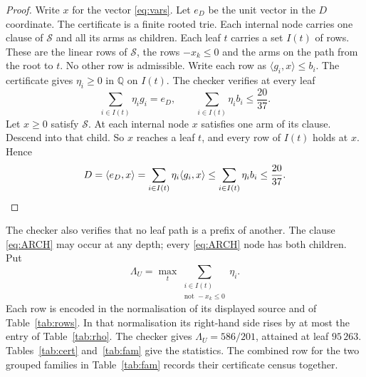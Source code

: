 \documentclass{amsart}
\theoremstyle{definition}
\theoremstyle{plain}
\numberwithin{equation}{section}
\numberwithin{table}{section}
\newcommand{\certLambda}{586/201}
\newcommand{\certLambdaLeaf}{95\,263}
\begin{document}
\begin{proof}
Write $x$ for the vector \eqref{eq:vars}. Let $e_D$ be the unit vector in the
$D$ coordinate. The certificate is a finite rooted trie. Each internal node
carries one clause of $\mathcal S$ and all its arms as children. Each leaf
$t$ carries a set $I(t)$ of rows. These are the linear rows of
$\mathcal S$, the rows $-x_k\le0$ and the arms on the path from the root to
$t$. No other row is admissible. Write each row as
 $\langle g_i,x\rangle\le b_i$. The certificate gives $\eta_i\ge0$ in
$\mathbb Q$ on $I(t)$. The checker verifies at every leaf
\begin{equation}\label{eq:farkas}
 \sum_{i\in I(t)}\eta_i g_i=e_D,
 \qquad
 \sum_{i\in I(t)}\eta_i b_i\le\frac{20}{37}.
\end{equation}
Let $x\ge0$ satisfy $\mathcal S$. At each internal node $x$ satisfies one arm
of its clause. Descend into that child. So $x$ reaches a leaf $t$, and
every row of $I(t)$ holds at $x$. Hence
\begin{equation}\label{eq:chain}
 D=\langle e_D,x\rangle
 =\sum_{i\in I(t)}\eta_i\langle g_i,x\rangle
 \le\sum_{i\in I(t)}\eta_i b_i
 \le\frac{20}{37}. \qedhere
\end{equation}
\end{proof}

The checker also verifies that no leaf path is a prefix of another. The
clause \eqref{eq:ARCH} may occur at any depth; every \eqref{eq:ARCH} node has
both children. Put
\begin{equation}\label{eq:Lambda}
 \Lambda_U=\max_t\sum_{\substack{i\in I(t)\\ \text{not }-x_k\le0}}\eta_i .
\end{equation}
Each row is encoded in the normalisation of its displayed source and of
Table~\ref{tab:rows}. In that normalisation its right-hand side rises by at
most the entry of Table~\ref{tab:rho}. The checker gives $\Lambda_U=\certLambda$, attained at leaf
$\certLambdaLeaf$. Tables~\ref{tab:cert} and~\ref{tab:fam} give the
statistics. The combined row for the two grouped families in Table~\ref{tab:fam}
records their certificate census together.
\end{document}
